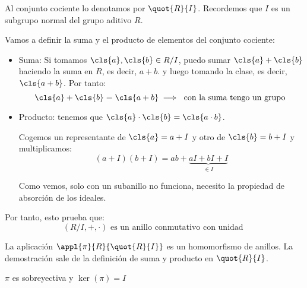 Al conjunto cociente lo denotamos por $\quot{R}{I}$. Recordemos que $I$ es un subgrupo normal del grupo aditivo $R$.

Vamos a definir la suma y el producto de elementos del conjunto cociente:

\begin{itemize}
	\item Suma: Si tomamos $\cls{a}, \cls{b} \in R/I$, puedo sumar $\cls{a}+\cls{b}$ haciendo la suma en $R$, es decir, $a+b$. y luego tomando la clase, es decir, $\cls{a+b}$. Por tanto:
	$$ \cls{a}+\cls{b} = \cls{a+b} \implies \text{ con la suma tengo un grupo }$$
	\item Producto: tenemos que $ \cls{a}\cdot\cls{b} = \cls{a\cdot b} $.

	Cogemos un representante de $\cls{a}=a+I$ y otro de $\cls{b}=b+I$ y multiplicamos:
	$$ (a+I)(b+I)=ab+\underbrace{aI+bI+I}_{\in I} $$

	Como vemos, solo con un subanillo no funciona, necesito la propiedad de absorción de los ideales.
\end{itemize}

Por tanto, esto prueba que:
$$(R/I,+,\cdot) \text{ es un anillo conmutativo con unidad }$$

\begin{prop}\label{prop:pi_homomorfismo}
	La aplicación $\appl{\pi}{R}{\quot{R}{I}}$ es un homomorfismo de anillos. La demostración sale de la definición de suma y producto en $\quot{R}{I}$.
\end{prop}

\obs $\pi$ es sobreyectiva y $\ker(\pi)=I$

